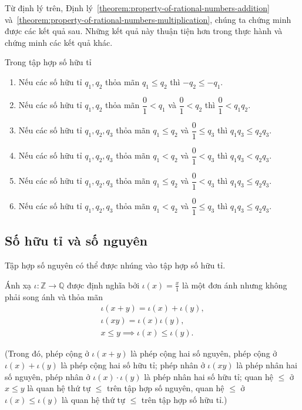 Từ định lý trên, Định lý~\ref{theorem:property-of-rational-numbers-addition} và~\ref{theorem:property-of-rational-numbers-multiplication}, chúng ta chứng minh được các kết quả sau. Những kết quả này thuận tiện hơn trong thực hành và chứng minh các kết quả khác.
\begin{theorem}\label{theorem:rational-numbers-order-and-operations-sequel}
    Trong tập hợp số hữu tỉ
    \begin{enumerate}[label={(\roman*)}]
        \item Nếu các số hữu tỉ $q_{1}, q_{2}$ thỏa mãn $q_{1}\leq q_{2}$ thì $-q_{2}\leq -q_{1}$.
        \item Nếu các số hữu tỉ $q_{1}, q_{2}$ thỏa mãn $\dfrac{0}{1} < q_{1}$ và $\dfrac{0}{1} < q_{2}$ thì $\dfrac{0}{1} < q_{1}q_{2}$.
        \item Nếu các số hữu tỉ $q_{1}, q_{2}, q_{3}$ thỏa mãn $q_{1}\leq q_{2}$ và $\dfrac{0}{1}\leq q_{3}$ thì $q_{1}q_{3}\leq q_{2}q_{3}$.
        \item Nếu các số hữu tỉ $q_{1}, q_{2}, q_{3}$ thỏa mãn $q_{1} < q_{2}$ và $\dfrac{0}{1} < q_{3}$ thì $q_{1}q_{3} < q_{2}q_{3}$.
        \item Nếu các số hữu tỉ $q_{1}, q_{2}, q_{3}$ thỏa mãn $q_{1}\leq q_{2}$ và $\dfrac{0}{1} < q_{3}$ thì $q_{1}q_{3}\leq q_{2}q_{3}$.
        \item Nếu các số hữu tỉ $q_{1}, q_{2}, q_{3}$ thỏa mãn $q_{1} < q_{2}$ và $\dfrac{0}{1}\leq q_{3}$ thì $q_{1}q_{3}\leq q_{2}q_{3}$.
    \end{enumerate}
\end{theorem}

\subsection{Số hữu tỉ và số nguyên}

Tập hợp số nguyên có thể được nhúng vào tập hợp số hữu tỉ.
\begin{theorem}\label{theorem:embed-Z-into-Q}
    Ánh xạ $\iota: \mathbb{Z}\to \mathbb{Q}$ được định nghĩa bởi $\iota(x) = \frac{x}{1}$ là một đơn ánh nhưng không phải song ánh và thỏa mãn
    \[
        \begin{split}
            \iota(x + y) = \iota(x) + \iota(y), \\
            \iota(xy) = \iota(x)\iota(y), \\
            x\leq y \implies \iota(x)\leq \iota(y).
        \end{split}
    \]

    (Trong đó, phép cộng ở $\iota(x + y)$ là phép cộng hai số nguyên, phép cộng ở $\iota(x) + \iota(y)$ là phép cộng hai số hữu tỉ; phép nhân ở $\iota(xy)$ là phép nhân hai số nguyên, phép nhân ở $\iota(x)\cdot\iota(y)$ là phép nhân hai số hữu tỉ; quan hệ $\leq$ ở $x\leq y$ là quan hệ thứ tự $\leq$ trên tập hợp số nguyên, quan hệ $\leq$ ở $\iota(x)\leq \iota(y)$ là quan hệ thứ tự $\leq$ trên tập hợp số hữu tỉ.)
\end{theorem}

